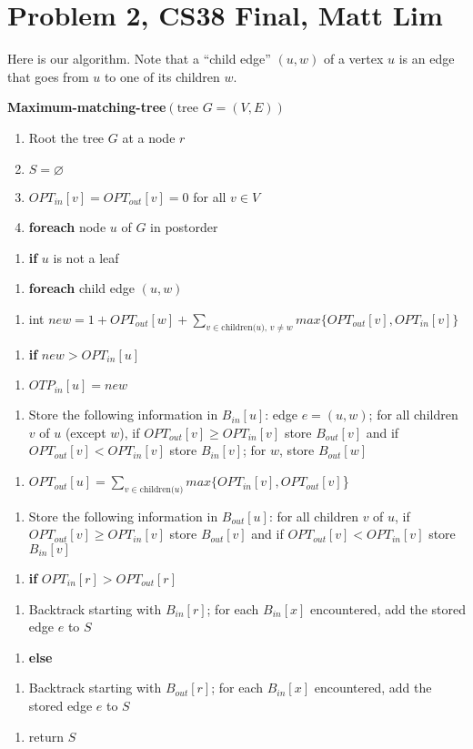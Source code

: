 \documentclass{article}
\newcommand{\modifyenum}[1]{%
  \end{enumerate}
  \begin{enumerate}[resume,#1]
}
\begin{document}
\section*{Problem 2, CS38 Final, Matt Lim}
Here is our algorithm. Note that a ``child edge'' $(u,w)$ of a vertex $u$ is an edge
that goes from $u$ to one of its children $w$.

\vspace{5mm}

\textbf{Maximum-matching-tree}$(\text{tree } G = (V,E))$
\begin{enumerate}
    \item Root the tree $G$ at a node $r$
    \item $S = \varnothing$
    \item $OPT_{in}[v] = OPT_{out}[v] = 0$ for all $v \in V$
    \item \textbf{foreach} node $u$ of $G$ in postorder
    \modifyenum{leftmargin=50pt}
    \item \textbf{if} $u$ is not a leaf
    \modifyenum{leftmargin=75pt}
    \item \textbf{foreach} child edge $(u,w)$
    \modifyenum{leftmargin=100pt}
    \item int $new = 1 + OPT_{out}[w] +
        \sum_{v \in \text{children($u$), $v \neq w$}} max\{OPT_{out}[v],
        OPT_{in}[v]\}$
    \modifyenum{leftmargin=100pt}
    \item \textbf{if} $new > OPT_{in}[u]$
    \modifyenum{leftmargin=125pt}
    \item $OTP_{in}[u] = new$
    \modifyenum{leftmargin=125pt}
    \item Store the following information in
        $B_{in}[u]$: edge $e = (u,w)$; for all children $v$ of $u$ (except $w$),
        if $OPT_{out}[v] \geq OPT_{in}[v]$ store $B_{out}[v]$ and
        if $OPT_{out}[v] < OPT_{in}[v]$ store $B_{in}[v]$; for $w$, store
        $B_{out}[w]$
    \modifyenum{leftmargin=75pt}
    \item $OPT_{out}[u] =
        \sum_{v \in \text{children($u$)}} max\{OPT_{in}[v], OPT_{out}[v]$\}
    \modifyenum{leftmargin=75pt}
    \item Store the following information in
        $B_{out}[u]$: for all children $v$ of $u$,
        if $OPT_{out}[v] \geq OPT_{in}[v]$ store $B_{out}[v]$ and
        if $OPT_{out}[v] < OPT_{in}[v]$ store $B_{in}[v]$
    \modifyenum{leftmargin=25pt}
    \item \textbf{if} $OPT_{in}[r] > OPT_{out}[r]$
    \modifyenum{leftmargin=50pt}
    \item Backtrack starting with $B_{in}[r]$; for
        each $B_{in}[x]$ encountered, add the stored edge $e$ to $S$
    \modifyenum{leftmargin=25pt}
    \item \textbf{else}
    \modifyenum{leftmargin=50pt}
    \item Backtrack starting with $B_{out}[r]$; for each $B_{in}[x]$ encountered,
        add the stored edge $e$ to $S$
    \modifyenum{leftmargin=25pt}
    \item return $S$
\end{enumerate}
\end{document}
